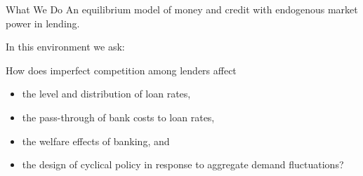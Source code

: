 \documentclass[10pt,english,slidetop,compress,
              blue,mathserif,color=option]{beamer}
\theoremstyle{plain}
\theoremstyle{definition}
\begin{document}
\begin{frame}{What We Do}
  An equilibrium model of \alert{money} and \alert{credit} with \alert{endogenous market power in lending}.

  \bigskip

  In this environment we ask:

  \bigskip

  How does imperfect competition among lenders affect
  \begin{itemize}
    \item the level and distribution of loan rates,
    \item the pass-through of bank costs to loan rates,
    \item the welfare effects of banking, and
    \item the design of cyclical policy in response to aggregate demand fluctuations?
  \end{itemize}
\end{frame}
\end{document}
